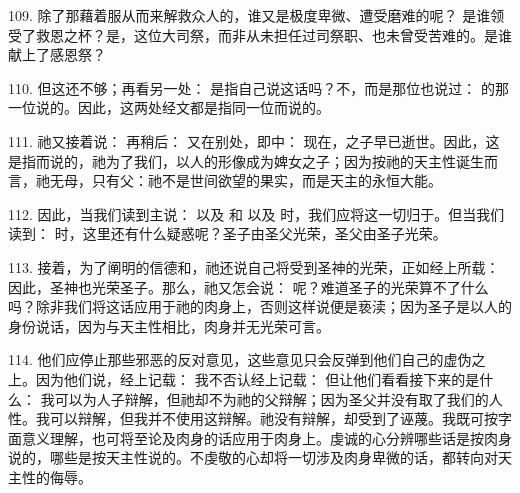 109. 除了那藉着服从而来解救众人的，谁又是极度卑微、遭受磨难的呢？  是谁领受了救恩之杯？是，这位大司祭，而非从未担任过司祭职、也未曾受苦难的。是谁献上了感恩祭？\par

110. 但这还不够；再看另一处： 是指自己说这话吗？不，而是那位也说过： 的那一位说的。因此，这两处经文都是指同一位而说的。\par

111. 祂又接着说： 再稍后： 又在别处，即中：  现在，之子早已逝世。因此，这是指而说的，祂为了我们，以人的形像成为婢女之子；因为按祂的天主性诞生而言，祂无母，只有父：祂不是世间欲望的果实，而是天主的永恒大能。\par

112. 因此，当我们读到主说：  以及  和   以及   时，我们应将这一切归于。但当我们读到：  时，这里还有什么疑惑呢？圣子由圣父光荣，圣父由圣子光荣。\par

113. 接着，为了阐明的信德和，祂还说自己将受到圣神的光荣，正如经上所载：  因此，圣神也光荣圣子。那么，祂又怎会说：  呢？难道圣子的光荣算不了什么吗？除非我们将这话应用于祂的肉身上，否则这样说便是亵渎；因为圣子是以人的身份说话，因为与天主性相比，肉身并无光荣可言。\par

114. 他们应停止那些邪恶的反对意见，这些意见只会反弹到他们自己的虚伪之上。因为他们说，经上记载： 我不否认经上记载： 但让他们看看接下来的是什么： 我可以为人子辩解，但祂却不为祂的父辩解；因为圣父并没有取了我们的人性。我可以辩解，但我并不使用这辩解。祂没有辩解，却受到了诬蔑。我既可按字面意义理解，也可将至论及肉身的话应用于肉身上。虔诚的心分辨哪些话是按肉身说的，哪些是按天主性说的。不虔敬的心却将一切涉及肉身卑微的话，都转向对天主性的侮辱。\par

